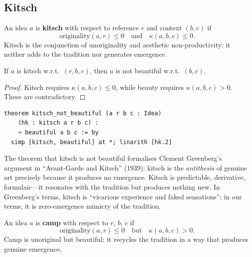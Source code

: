 \subsection{Kitsch}

\begin{definition}[Kitsch]
\label{def:kitsch}
An idea $a$ is \textbf{kitsch} with respect to reference $r$ and
context $(b, c)$ if
\[
  \mathrm{originality}(a, r) \leq 0
  \quad \text{and} \quad
  \kappa(a, b, c) \leq 0.
\]
Kitsch is the conjunction of unoriginality and aesthetic non-productivity:
it neither adds to the tradition nor generates emergence.
\end{definition}

\begin{theorem}
\label{thm:kitsch-not-beautiful}
If $a$ is kitsch w.r.t.\ $(r, b, c)$, then $a$ is not beautiful w.r.t.\
$(b, c)$.
\end{theorem}

\begin{proof}
Kitsch requires $\kappa(a, b, c) \leq 0$, while beauty requires
$\kappa(a, b, c) > 0$.  These are contradictory.
\end{proof}

\begin{lstlisting}
theorem kitsch_not_beautiful (a r b c : Idea)
    (hk : kitsch a r b c) :
    ¬ beautiful a b c := by
  simp [kitsch, beautiful] at *; linarith [hk.2]
\end{lstlisting}

\begin{interpretation}
\label{int:kitsch-greenberg}
The theorem that kitsch is not beautiful formalises Clement Greenberg's
argument in ``Avant-Garde and Kitsch'' (1939): kitsch is the
\emph{antithesis} of genuine art precisely because it produces no emergence.
Kitsch is predictable, derivative, formulaic---it resonates with the
tradition but produces nothing new.  In Greenberg's terms, kitsch is
``vicarious experience and faked sensations''; in our terms, it is
zero-emergence mimicry of the tradition.
\end{interpretation}

\begin{definition}[Camp]
\label{def:camp}
An idea $a$ is \textbf{camp} with respect to $r$, $b$, $c$ if
\[
  \mathrm{originality}(a, r) \leq 0
  \quad \text{but} \quad
  \kappa(a, b, c) > 0.
\]
Camp is unoriginal but beautiful: it recycles the tradition in a way
that produces genuine emergence.
\end{definition}

